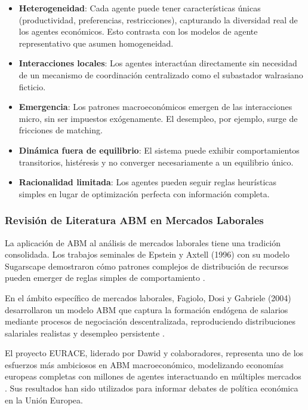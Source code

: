 \begin{itemize}
    \item \textbf{Heterogeneidad}: Cada agente puede tener características únicas (productividad, preferencias, restricciones), capturando la diversidad real de los agentes económicos. Esto contrasta con los modelos de agente representativo que asumen homogeneidad.
    \item \textbf{Interacciones locales}: Los agentes interactúan directamente sin necesidad de un mecanismo de coordinación centralizado como el subastador walrasiano ficticio.
    \item \textbf{Emergencia}: Los patrones macroeconómicos emergen de las interacciones micro, sin ser impuestos exógenamente. El desempleo, por ejemplo, surge de fricciones de matching.
    \item \textbf{Dinámica fuera de equilibrio}: El sistema puede exhibir comportamientos transitorios, histéresis y no converger necesariamente a un equilibrio único.
    \item \textbf{Racionalidad limitada}: Los agentes pueden seguir reglas heurísticas simples en lugar de optimización perfecta con información completa.
\end{itemize}

\subsubsection{Revisión de Literatura ABM en Mercados Laborales}

La aplicación de ABM al análisis de mercados laborales tiene una tradición consolidada. Los trabajos seminales de Epstein y Axtell (1996) con su modelo Sugarscape demostraron cómo patrones complejos de distribución de recursos pueden emerger de reglas simples de comportamiento \cite{epstein1996}.

En el ámbito específico de mercados laborales, Fagiolo, Dosi y Gabriele (2004) desarrollaron un modelo ABM que captura la formación endógena de salarios mediante procesos de negociación descentralizada, reproduciendo distribuciones salariales realistas y desempleo persistente \cite{fagiolo2004}.

El proyecto EURACE, liderado por Dawid y colaboradores, representa uno de los esfuerzos más ambiciosos en ABM macroeconómico, modelizando economías europeas completas con millones de agentes interactuando en múltiples mercados \cite{dawid2012eurace}. Sus resultados han sido utilizados para informar debates de política económica en la Unión Europea.

